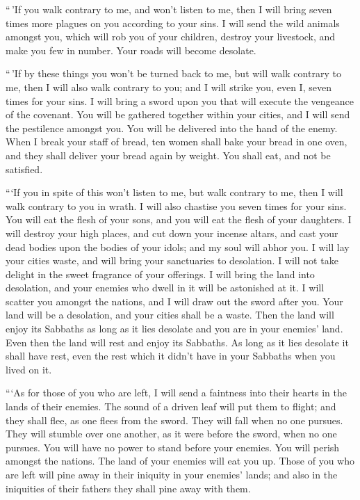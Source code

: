  ``\,'If you walk contrary to me, and won't listen to me,
then I will bring seven times more plagues on you according to your
sins.  I will send the wild animals amongst you, which
will rob you of your children, destroy your livestock, and make you few
in number. Your roads will become desolate.

 ``\,'If by these things you won't be turned back to me,
but will walk contrary to me,  then I will also walk
contrary to you; and I will strike you, even I, seven times for your
sins.  I will bring a sword upon you that will execute
the vengeance of the covenant. You will be gathered together within your
cities, and I will send the pestilence amongst you. You will be
delivered into the hand of the enemy.  When I break your
staff of bread, ten women shall bake your bread in one oven, and they
shall deliver your bread again by weight. You shall eat, and not be
satisfied.

 ```If you in spite of this won't listen to me, but walk
contrary to me,  then I will walk contrary to you in
wrath. I will also chastise you seven times for your sins.
 You will eat the flesh of your sons, and you will eat
the flesh of your daughters.  I will destroy your high
places, and cut down your incense altars, and cast your dead bodies upon
the bodies of your idols; and my soul will abhor you.  I
will lay your cities waste, and will bring your sanctuaries to
desolation. I will not take delight in the sweet fragrance of your
offerings.  I will bring the land into desolation, and
your enemies who dwell in it will be astonished at it.  I
will scatter you amongst the nations, and I will draw out the sword
after you. Your land will be a desolation, and your cities shall be a
waste.  Then the land will enjoy its Sabbaths as long as
it lies desolate and you are in your enemies' land. Even then the land
will rest and enjoy its Sabbaths.  As long as it lies
desolate it shall have rest, even the rest which it didn't have in your
Sabbaths when you lived on it.

 ```As for those of you who are left, I will send a
faintness into their hearts in the lands of their enemies. The sound of
a driven leaf will put them to flight; and they shall flee, as one flees
from the sword. They will fall when no one pursues.  They
will stumble over one another, as it were before the sword, when no one
pursues. You will have no power to stand before your enemies.
 You will perish amongst the nations. The land of your
enemies will eat you up.  Those of you who are left will
pine away in their iniquity in your enemies' lands; and also in the
iniquities of their fathers they shall pine away with them.

